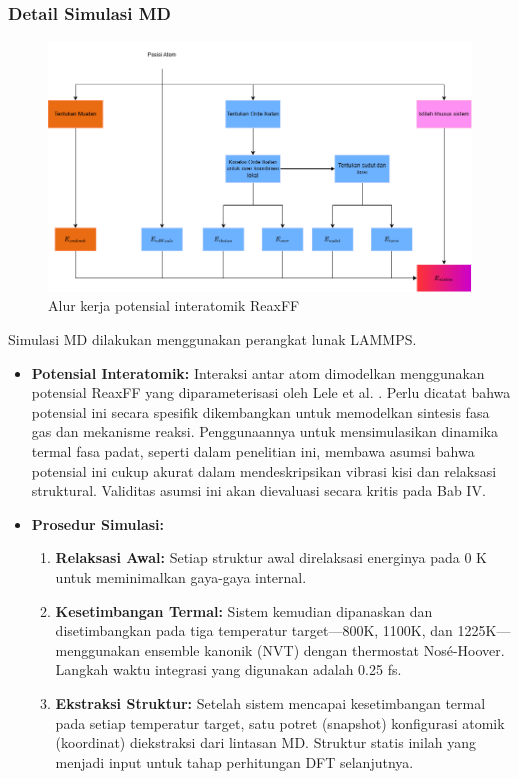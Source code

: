 \subsubsection{Detail Simulasi MD}

\begin{figure}
    \centering
    \includegraphics[width=0.9\linewidth]{gambar/Diagram_reaxff}
    \caption{Alur kerja potensial interatomik ReaxFF }
    \label{Diagram Alir Reaxff}
\end{figure}

Simulasi MD dilakukan menggunakan perangkat lunak LAMMPS.
\begin{itemize}
    \item \textbf{Potensial Interatomik:} Interaksi antar atom dimodelkan menggunakan potensial ReaxFF yang diparameterisasi oleh Lele et al. \citep{Lele2022}. Perlu dicatat bahwa potensial ini secara spesifik dikembangkan untuk memodelkan sintesis fasa gas dan mekanisme reaksi. Penggunaannya untuk mensimulasikan dinamika termal fasa padat, seperti dalam penelitian ini, membawa asumsi bahwa potensial ini cukup akurat dalam mendeskripsikan vibrasi kisi dan relaksasi struktural. Validitas asumsi ini akan dievaluasi secara kritis pada Bab IV.
    \item \textbf{Prosedur Simulasi:}
    \begin{enumerate}
        \item \textbf{Relaksasi Awal:} Setiap struktur awal direlaksasi energinya pada 0 K untuk meminimalkan gaya-gaya internal.
        \item \textbf{Kesetimbangan Termal:} Sistem kemudian dipanaskan dan disetimbangkan pada tiga temperatur target—800K, 1100K, dan 1225K—menggunakan ensemble kanonik (NVT) dengan thermostat Nosé-Hoover. Langkah waktu integrasi yang digunakan adalah 0.25 fs.
        \item \textbf{Ekstraksi Struktur:} Setelah sistem mencapai kesetimbangan termal pada setiap temperatur target, satu potret (snapshot) konfigurasi atomik (koordinat) diekstraksi dari lintasan MD. Struktur statis inilah yang menjadi input untuk tahap perhitungan DFT selanjutnya.
    \end{enumerate}
\end{itemize}


